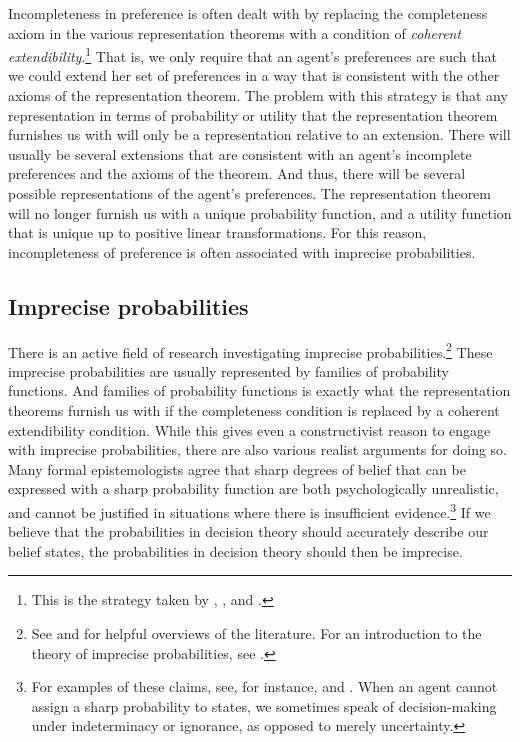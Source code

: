 Incompleteness in preference is often dealt with by replacing the completeness axiom in the various representation theorems with a condition of {\em coherent extendibility}.\footnote{This is the strategy taken by \citet{Kaplan1983}, \citet{Jeffrey1983}, and \citet{Joyce1999}.} That is, we only require that an agent's preferences are such that we could extend her set of preferences in a way that is consistent with the other axioms of the representation theorem. The problem with this strategy is that any representation in terms of probability or utility that the representation theorem furnishes us with will only be a representation relative to an extension. There will usually be several extensions that are consistent with an agent's incomplete preferences and the axioms of the theorem. And thus, there will be several possible representations of the agent's preferences. The representation theorem will no longer furnish us with a unique probability function, and a utility function that is unique up to positive linear transformations. For this reason, incompleteness of preference is often associated with imprecise probabilities.

\subsection{Imprecise probabilities}\label{subs42}

There is an active field of research investigating imprecise probabilities.\footnote{See \citet{Bradley2015} and \citet{Mahtani2019} for helpful overviews of the literature. For an introduction to the theory of imprecise probabilities, see \citet{Augustin2014}.} These imprecise probabilities are usually represented by families of probability functions. And families of probability functions is exactly what the representation theorems furnish us with if the completeness condition is replaced by a coherent extendibility condition. While this gives even a constructivist reason to engage with imprecise probabilities, there are also various realist arguments for doing so. Many formal epistemologists agree that sharp degrees of belief that can be expressed with a sharp probability function are both psychologically unrealistic, and cannot be justified in situations where there is insufficient evidence.\footnote{For examples of these claims, see, for instance, \citet{Levi1980} and \citet{Kaplan1996}. When an agent cannot assign a sharp probability to states, we sometimes speak of decision-making under indeterminacy or ignorance, as opposed to merely uncertainty.} If we believe that the probabilities in decision theory should accurately describe our belief states, the probabilities in decision theory should then be imprecise.

